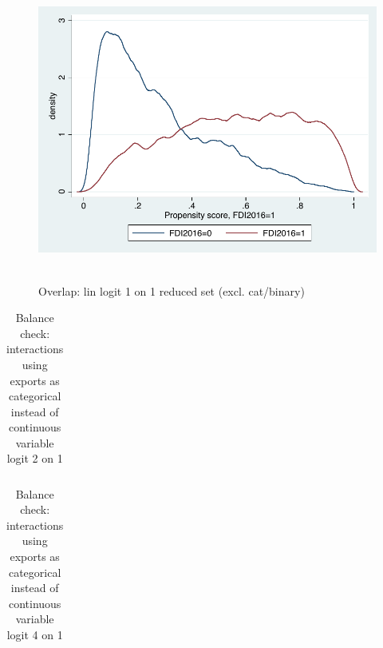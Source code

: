 \documentclass[11pt,a4paper,leqno]{article}
\begin{document}
\begin{figure}
	\centering
	\includegraphics[scale=0.6]{figures_and_tables/3_overlap_linearlogit1o1_reduced.pdf}\
	\caption{Overlap: lin logit 1 on 1 reduced set (excl. cat/binary) }
	\label{ol_linlog1_red}
\end{figure}

\begin{table}
	\begin{tabular}{lcccc}
	
	\end{tabular}
	\caption{Balance check: interactions using exports as categorical instead of continuous variable logit 2 on 1}
	\label{bal_intcatlog2}
\end{table}

\begin{table}
	\begin{tabular}{lcccc}
	
	\end{tabular}
	\caption{Balance check: interactions using exports as categorical instead of continuous variable logit 4 on 1}
	\label{bal_intcatlog4}
\end{table}
\end{document}
